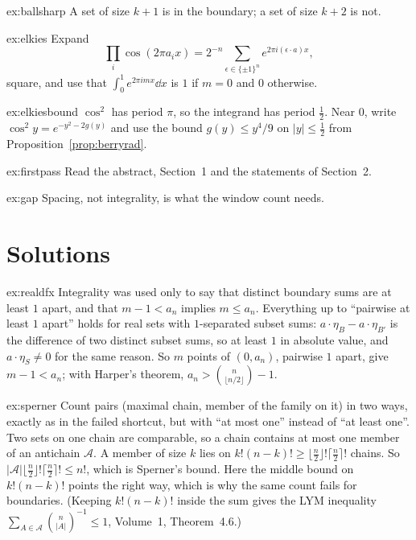 \begin{hint}{ex:ballsharp}
A set of size $k+1$ is in the boundary; a set of size $k+2$ is not.
\end{hint}

\begin{hint}{ex:elkies}
Expand
\[
\prod_i\cos(2\pi a_ix)=2^{-n}\sum_{\epsilon\in\{\pm1\}^n}e^{2\pi i(\epsilon\cdot a)x},
\]
square, and use that $\int_0^1e^{2\pi imx}\dd x$ is $1$ if $m=0$ and $0$ otherwise.
\end{hint}

\begin{hint}{ex:elkiesbound}
$\cos^2$ has period $\pi$, so the integrand has period $\frac12$. Near $0$, write $\cos^2y=e^{-y^2-2g(y)}$ and use the bound $g(y)\le y^4/9$ on $|y|\le\frac12$ from Proposition~\ref{prop:berryrad}.
\end{hint}

\begin{hint}{ex:firstpass}
Read the abstract, Section~1 and the statements of Section~2.
\end{hint}

\begin{hint}{ex:gap}
Spacing, not integrality, is what the window count needs.
\end{hint}

\section{Solutions}

\begin{solution}{ex:realdfx}
\idea Integrality was used only to say that distinct boundary sums are at least $1$ apart, and that $m-1<a_n$ implies $m\le a_n$.
\writeup Everything up to ``pairwise at least $1$ apart'' holds for real sets with $1$-separated subset sums: $a\cdot\eta_B-a\cdot\eta_{B'}$ is the difference of two distinct subset
sums, so at least $1$ in absolute value, and $a\cdot\eta_S\ne0$ for the same reason. So $m$ points of $(0,a_n)$, pairwise $1$ apart, give $m-1<a_n$; with Harper's theorem, $a_n>\binom n{\lfloor n/2\rfloor}-1$.
\end{solution}

\begin{solution}{ex:sperner}
\idea Count pairs (maximal chain, member of the family on it) in two ways, exactly as in the failed shortcut, but with ``at most one'' instead of ``at least one''.
\writeup Two sets on one chain are comparable, so a chain contains at most one member of an antichain $\mathcal A$. A member of size $k$ lies on $k!(n-k)!\ge\lfloor\frac n2\rfloor!\lceil\frac n2\rceil!$ chains. So
$|\mathcal A|\lfloor\frac n2\rfloor!\lceil\frac n2\rceil!\le n!$, which is Sperner's bound. Here the middle bound on $k!(n-k)!$ points the right way, which is why the same count fails for boundaries. (Keeping $k!(n-k)!$ inside the sum gives the LYM inequality $\sum_{A\in\mathcal A}\binom n{|A|}^{-1}\le1$, Volume~1, Theorem~4.6.)
\end{solution}

